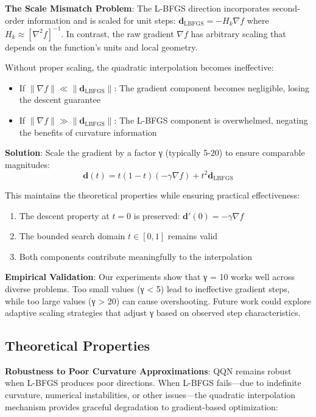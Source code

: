 \textbf{The Scale Mismatch Problem}: The L-BFGS direction incorporates second-order information and is scaled for unit steps: \(\mathbf{d}_{\text{LBFGS}} = -H_k \nabla f\) where \(H_k \approx [\nabla^2 f]^{-1}\).
In contrast, the raw gradient \(\nabla f\) has arbitrary scaling that depends on the function's units and local geometry.

Without proper scaling, the quadratic interpolation becomes ineffective:

\begin{itemize}
\tightlist
\item
  If \(\|\nabla f\| \ll \|\mathbf{d}_{\text{LBFGS}}\|\): The gradient component becomes negligible, losing the descent guarantee
\item
  If \(\|\nabla f\| \gg \|\mathbf{d}_{\text{LBFGS}}\|\): The L-BFGS component is overwhelmed, negating the benefits of curvature information
\end{itemize}

\textbf{Solution}: Scale the gradient by a factor γ (typically 5-20) to ensure comparable magnitudes:
\[\mathbf{d}(t) = t(1-t)(-\gamma \nabla f) + t^2 \mathbf{d}_{\text{LBFGS}}\]

This maintains the theoretical properties while ensuring practical effectiveness:

\begin{enumerate}
\def\labelenumi{\arabic{enumi}.}
\tightlist
\item
  The descent property at \(t=0\) is preserved: \(\mathbf{d}'(0) = -\gamma \nabla f\)
\item
  The bounded search domain \(t \in [0,1]\) remains valid
\item
  Both components contribute meaningfully to the interpolation
\end{enumerate}

\textbf{Empirical Validation}: Our experiments show that γ = 10 works well across diverse problems. Too small values (γ \textless{} 5) lead to ineffective gradient steps, while too large values (γ \textgreater{} 20) can cause overshooting. Future work could explore adaptive scaling strategies that adjust γ based on observed step characteristics.

\hypertarget{theoretical-properties}{%
\subsection{Theoretical Properties}\label{theoretical-properties}}

\textbf{Robustness to Poor Curvature Approximations}: QQN remains robust when L-BFGS produces poor directions.
When L-BFGS fails---due to indefinite curvature, numerical instabilities, or other issues---the quadratic interpolation mechanism provides graceful degradation to gradient-based optimization:

